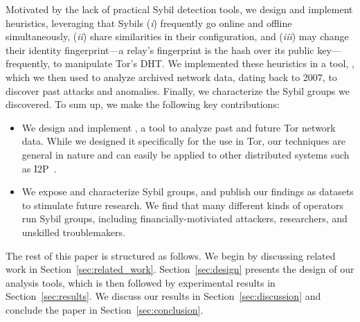 Motivated by the lack of practical Sybil detection tools, we design and
implement heuristics, leveraging that Sybils (\emph{i}) frequently go online and
offline simultaneously, (\emph{ii}) share similarities in their configuration,
and (\emph{iii}) may change their identity fingerprint---a relay's fingerprint
is the hash over its public key---frequently, to manipulate Tor's DHT.  We
implemented these heuristics in a tool, \sys, which we then used to analyze
archived network data, dating back to 2007, to discover past attacks and
anomalies.  Finally, we characterize the Sybil groups we discovered.  To sum up,
we make the following key contributions:
\begin{itemize}
	\item We design and implement \sys, a tool to analyze past and future Tor
		network data.  While we designed it specifically for the use in Tor, our
		techniques are general in nature and can easily be applied to other
		distributed systems such as I2P~\cite{i2p}.
	\item We expose and characterize Sybil groups, and publish our findings as
		datasets to stimulate future research.  We find that many different
		kinds of operators run Sybil groups, including financially-motiviated
		attackers, researchers, and unskilled troublemakers.
\end{itemize}

The rest of this paper is structured as follows.  We begin by discussing
related work in Section~\ref{sec:related_work}.  Section~\ref{sec:design}
presents the design of our analysis tools, which is then followed by
experimental results in Section~\ref{sec:results}.  We discuss our results in
Section~\ref{sec:discussion} and conclude the paper in
Section~\ref{sec:conclusion}.
